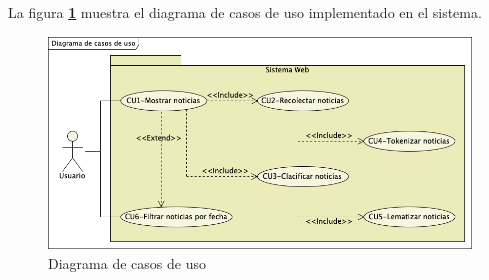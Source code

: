 


La figura \textbf{\ref{fig:DCU}} muestra el diagrama de casos de uso implementado en el sistema.

\begin{figure}[h]
  \centering
  \includegraphics[scale=.45]{imagenes/Diagramas/CasosDeuso}
  \caption{Diagrama de casos de uso}
  \label{fig:DCU}
\end{figure}

